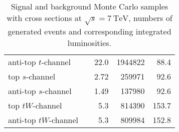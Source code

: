 \begin{table}[!htbp]
\begin{tabular}{|l|l|r|r|r|}
\hspace{5 mm} anti-top $t$-channel & & 22.0 & 1944822 & 88.4 \\
\hspace{5 mm} top $s$-channel & & 2.72 & 259971 & 92.6 \\
\hspace{5 mm} anti-top $s$-channel & & 1.49 & 137980 & 92.6 \\
\hspace{5 mm} top $tW$-channel & & 5.3 & 814390 & 153.7 \\
\hspace{5 mm} anti-top $tW$-channel & & 5.3 & 809984 & 152.8 \\
\bottomrule
\end{tabular}
\caption{Signal and background Monte Carlo samples with cross sections at $\sqrt s =
\SI{7}{\TeV}$, numbers of generated events and corresponding integrated
luminosities.}
\label{tab:top_mass_mc_samples}
\end{table}


